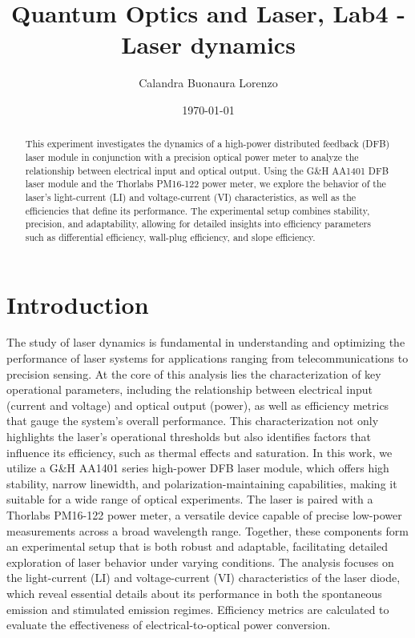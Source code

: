 \documentclass[prl,twocolumn]{revtex4-1}
\begin{document}
\title{Quantum Optics and Laser, Lab4 - Laser dynamics}



\author{Calandra Buonaura Lorenzo}

\date{\today}


\begin{abstract}

This experiment investigates the dynamics of a high-power distributed feedback (DFB) laser module in conjunction with a precision optical power meter to analyze the relationship between electrical input and optical output. Using the G\&H AA1401 DFB laser module and the Thorlabs PM16-122 power meter, we explore the behavior of the laser's light-current (LI) and voltage-current (VI) characteristics, as well as the efficiencies that define its performance. The experimental setup combines stability, precision, and adaptability, allowing for detailed insights into efficiency parameters such as differential efficiency, wall-plug efficiency, and slope efficiency.

\end{abstract}

\maketitle

\section{Introduction}

The study of laser dynamics is fundamental in understanding and optimizing the performance of laser systems for applications ranging from telecommunications to precision sensing. At the core of this analysis lies the characterization of key operational parameters, including the relationship between electrical input (current and voltage) and optical output (power), as well as efficiency metrics that gauge the system's overall performance. This characterization not only highlights the laser's operational thresholds but also identifies factors that influence its efficiency, such as thermal effects and saturation. In this work, we utilize a G\&H AA1401 series high-power DFB laser module, which offers high stability, narrow linewidth, and polarization-maintaining capabilities, making it suitable for a wide range of optical experiments. The laser is paired with a Thorlabs PM16-122 power meter, a versatile device capable of precise low-power measurements across a broad wavelength range. Together, these components form an experimental setup that is both robust and adaptable, facilitating detailed exploration of laser behavior under varying conditions. The analysis focuses on the light-current (LI) and voltage-current (VI) characteristics of the laser diode, which reveal essential details about its performance in both the spontaneous emission and stimulated emission regimes. Efficiency metrics are calculated to evaluate the effectiveness of electrical-to-optical power conversion.
\end{document}
